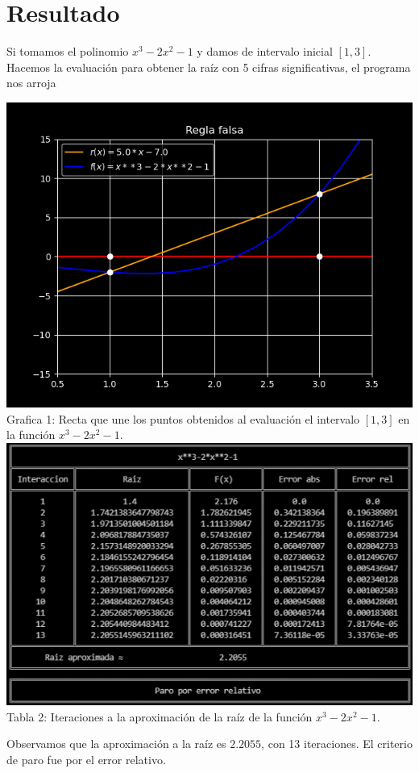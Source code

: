 \documentclass[12pt]{article}
\begin{document}
		\section*{\centering Resultado}\label{sec:Resultado}
			Si tomamos el polinomio $ x^3-2x^2-1 $ y damos de intervalo inicial $ [1,3] $. Hacemos 
			la evaluación para obtener la raíz con 5 cifras significativas, el programa nos arroja
			\begin{multicols}{2}
				\begin{center}
					\includegraphics[width=\linewidth]{Grafica 1.png}
					Grafica 1: Recta que une los puntos obtenidos al evaluación el intervalo $ [1,3] $ en la función \columnbreak $ x^3-2x^2-1 $.\\
					\includegraphics[width=\linewidth]{Tabla 1.png}
					Tabla 2: Iteraciones a la aproximación de la raíz de la función $ x^3-2x^2-1 $.
				\end{center}
			\end{multicols}
			Observamos que la aproximación a la raíz es $ 2.2055 $, con 13 iteraciones. El criterio de paro fue 
			por el error relativo.
\end{document}
